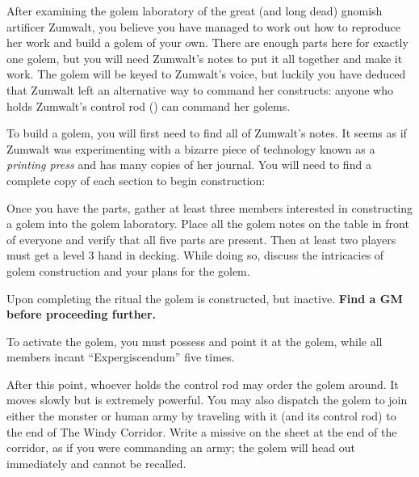 \documentclass[green]{guildcamp2}
\begin{document}
\name{\gGolem{}}

After examining the golem laboratory of the great (and long dead) gnomish artificer Zumwalt, you believe you have managed to work out how to reproduce her work and build a golem of your own. There are enough parts here for exactly one golem, but you will need Zumwalt's notes to put it all together and make it work. The golem will be keyed to Zumwalt's voice, but luckily you have deduced that Zumwalt left an alternative way to command her constructs: anyone who holds Zumwalt's control rod (\iGolemControlRod{}) can command her golems.

To build a golem, you will first need to find all of Zumwalt's notes. It seems as if Zumwalt was experimenting with a bizarre piece of technology known as a \emph{printing press} and has many copies of her journal. You will need to find a complete copy of each section to begin construction:

\begin{enum}[Requirements]
	\item \iGolemNotesA{}
	\item \iGolemNotesB{}
	\item \iGolemNotesC{}
	\item \iGolemNotesD{}
	\item \iGolemNotesE{}
\end{enum}

Once you have the parts, gather at least three members interested in constructing a golem into the golem laboratory. Place all the golem notes on the table in front of everyone and verify that all five parts are present. Then at least two players must get a level 3 hand in decking. While doing so, discuss the intricacies of golem construction and your plans for the golem.

Upon completing the ritual the golem is constructed, but inactive. {\bf Find a GM before proceeding further.}

To activate the golem, you must possess  \iGolemControlRod{} and point it at the golem, while all members incant ``Expergiscendum'' five times.

After this point, whoever holds the control rod may order the golem around. It moves slowly but is extremely powerful. You may also dispatch the golem to join either the monster or human army by traveling with it (and its control rod) to the end of The Windy Corridor. Write a missive on the sheet at the end of the corridor, as if you were commanding an army; the golem will head out immediately and cannot be recalled.
\end{document}
